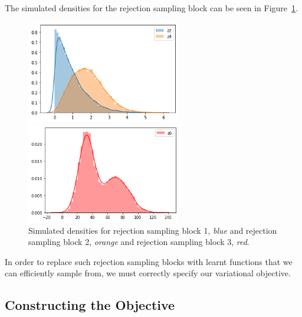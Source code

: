 \documentclass{article}
\begin{document}
The simulated densities for the rejection sampling block can be seen in Figure~\ref{fig:rs_simulated}.
\begin{figure}
  \label{fig:rs_simulated}
  \centering
  \begin{minipage}{.5\textwidth}
    \centering
    \includegraphics[width=0.6\textwidth, height=0.6\textheight, keepaspectratio]{rs_plots.png}
  \end{minipage}%
  \begin{minipage}{.5\textwidth}
    \centering
    \includegraphics[width=0.6\textwidth, height=0.6\textheight, keepaspectratio]{rs3_plot.png}
  \end{minipage}
  \caption{ Simulated densities for rejection sampling block 1, \emph{blue} and rejection
  sampling block 2, \emph{orange} and rejection sampling block 3, \emph{red}.}
 \end{figure}

In order to replace such rejection sampling blocks with learnt functions that we 
can efficiently sample from, we must correctly specify our variational objective.

\subsection{Constructing the Objective}
\end{document}
